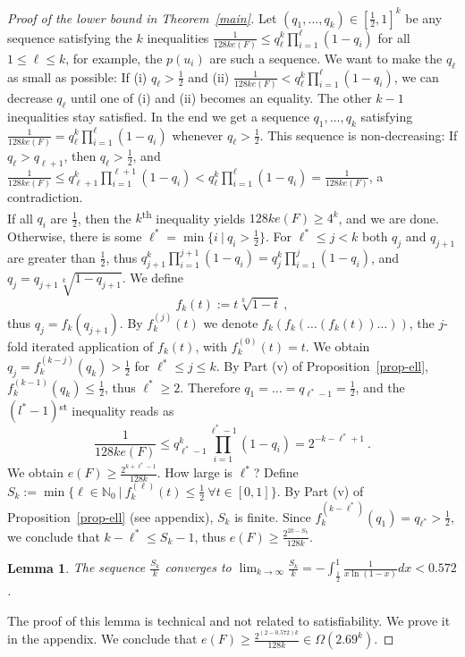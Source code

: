 \documentclass[a4paper, 11pt]{article}
\newtheorem{lemma}[theorem]{Lemma}
\begin{document}
\begin{proof}[Proof of the lower bound in Theorem~\ref{main}]
  Let $(q_1,\dots,q_k) \in [\frac{1}{2},1]^k$ be any sequence
  satisfying the $k$ inequalities $\frac{1}{128ke(F)} \leq q_\ell^k
  \prod_{i=1}^{\ell} (1-q_i)$ for all $1\leq\ell\leq k$, for example,
  the $p(u_i)$ are such a sequence. We want to make the $q_\ell$ as
  small as possible: If (i) $q_\ell > \frac{1}{2}$ and (ii)
  $\frac{1}{128ke(F)} < q_\ell^k \prod_{i=1}^{\ell} (1-q_i)$, we can
  decrease $q_\ell$ until one of (i) and (ii) becomes an equality.
  The other $k-1$ inequalities stay satisfied. In the end we get a
  sequence $q_1, \dots, q_k$ satisfying $\frac{1}{128ke(F)} = q_\ell^k
  \prod_{i=1}^{\ell} (1-q_i)$ whenever $q_\ell > \frac{1}{2}$. This
  sequence is non-decreasing: If $q_\ell > q_{\ell+1}$, then
  $q_\ell>\frac{1}{2}$, and $\frac{1}{128ke(F)} \leq
  q_{\ell+1}^k\prod_{i=1}^{\ell+1}(1-q_i) <
  q_{\ell}^k\prod_{i=1}^{\ell}(1-q_i) = \frac{1}{128ke(F)}$, a
  contradiction. \\

  If all $q_i$ are $\frac{1}{2}$, then the $k$\textsuperscript{th}
  inequality yields $128ke(F) \geq 4^k$, and we are done. Otherwise,
  there is some $\ell^* = \min\{i \ | \ q_i > \frac{1}{2}\}$. For
  $\ell^* \leq j < k$ both $q_j$ and $q_{j+1}$ are greater than
  $\frac{1}{2}$, thus
  $q_{j+1}^k\prod_{i=1}^{j+1}(1-q_i)=q_{j}^k\prod_{i=1}^{j}(1-q_i)$,
  and $q_j = q_{j+1} \sqrt[k]{1-q_{j+1}}$. We define
  $$
  f_k(t) := t \sqrt[k]{1-t} \  ,
  $$
  thus $q_j = f_k(q_{j+1})$. By $f_k^{(j)}(t )$ we denote $f_k (f_k (
  \dots (f_k(t)) \dots))$, the $j$-fold iterated application of
  $f_k(t)$, with $f_k^{(0)}(t)=t$. We obtain $q_j = f_k^{(k-j)}(q_k) >
  \frac{1}{2}$ for $\ell^* \leq j \leq k$.  By Part (v) of
  Proposition~\ref{prop-ell}, $f_k^{(k-1)}(q_k) \leq \frac{1}{2}$,
  thus $\ell^* \geq 2$. Therefore $q_1 = \dots= q_{\ell^* - 1} =
  \frac{1}{2}$, and the $(l^*-1)$\textsuperscript{st} inequality reads
  as
  $$\frac{1}{128ke(F)} \leq q_{\ell^*-1}^k \prod_{i=1}^{\ell^*-1} (1-q_i)
  = 2^{-k-\ell^*+1} \ .
  $$
  We obtain $e(F) \geq \frac{2^{k+\ell^*-1}}{128k}$. How large is
  $\ell^*$? Define $S_k := \min\{\ell\in\mathbb{N}_0 \ | \
  f_k^{(\ell)}(t) \leq \frac{1}{2}\ \forall t \in [0,1]\}.$ By Part
  (v) of Proposition~\ref{prop-ell} (see appendix), $S_k$ is finite.
  Since $f_k^{(k-\ell^*)}(q_1) = q_{\ell^*} > \frac{1}{2}$, we
  conclude that $k - \ell^* \leq S_k-1$, thus $e(F) \geq \frac{2^{2k -
      S_k}}{128k}$.
  
  \begin{lemma}
    The sequence $\frac{S_k}{k}$ converges to 
    $
    \lim_{k \rightarrow \infty} \frac{S_k}{k} 
    = - \int_{\frac{1}{2}}^1 \frac{1}{x \ln (1-x)} dx < 0.572 
    $.
    \label{prop-alpha}
  \end{lemma}
  
  The proof of this lemma is technical and not related to
  satisfiability. We prove it in the appendix. We conclude that $e(F)
  \geq \frac{2^{(2-0.572)k}}{128k} \in \Omega\left(2.69^k\right)$.
\end{proof}
\end{document}
